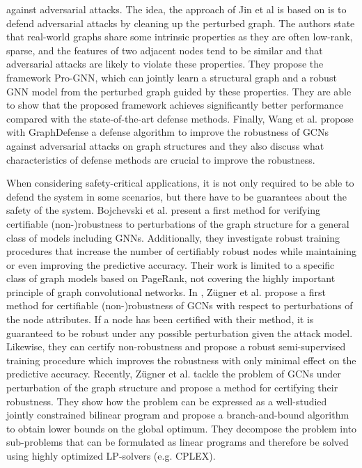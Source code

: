 \documentclass[a4paper,preprint]{sig-alternate}
\begin{document}
against adversarial attacks.\newline
The idea, the approach of Jin et al \cite{jin2020graph} is based on is to defend adversarial attacks by cleaning up the perturbed graph.
The authors state that real-world graphs share some intrinsic properties as they are often low-rank, sparse, and the features of two adjacent
nodes tend to be similar and that adversarial attacks are likely to violate these properties.\newline
They propose the framework Pro-GNN, which can jointly learn a structural graph and a robust GNN model from the perturbed graph guided by
these properties. They are able to show that the proposed framework achieves significantly better performance compared with the state-of-the-art 
defense methods.\newline
Finally, Wang et al. \cite{wang2019graphdefense} propose with GraphDefense a defense algorithm to improve the robustness of GCNs
against adversarial attacks on graph structures and they also discuss what characteristics of defense methods are crucial to improve 
the robustness.\newline

When considering safety-critical applications, it is not only required to be able to defend the system in some scenarios, but there
have to be guarantees about the safety of the system.\newline
Bojchevski et al. \cite{bojchevski2019certifiable} present a first method for verifying certifiable
(non-)robustness to perturbations of the graph structure for a general class of models including GNNs. Additionally, they investigate robust 
training procedures that increase the number of certifiably robust nodes while maintaining or even improving the predictive accuracy.
Their work is limited to a specific class of graph models based on PageRank, not covering the highly important principle of graph convolutional
networks. \cite{10.1145/3394486.3403217}\newline
In \cite{Z_gner_2019}, Zügner et al. propose a first method for certifiable (non-)robustness of GCNs with respect to 
perturbations of the node attributes. If a node has been certified with their method, it is guaranteed to be robust under any
possible perturbation given the attack model. Likewise, they can certify non-robustness and propose a robust semi-supervised training
procedure which improves the robustness with only minimal effect on the predictive accuracy.\newline
Recently, Zügner et al. \cite{10.1145/3394486.3403217} tackle the problem of GCNs under perturbation of the graph structure and propose a method
for certifying their robustness. They show how the problem can be expressed as a well-studied jointly constrained bilinear program and
propose a branch-and-bound algorithm to obtain lower bounds on the global optimum. They decompose the problem into sub-problems that can
be formulated as linear programs and therefore be solved using highly optimized LP-solvers (e.g. CPLEX).\newline
\end{document}
